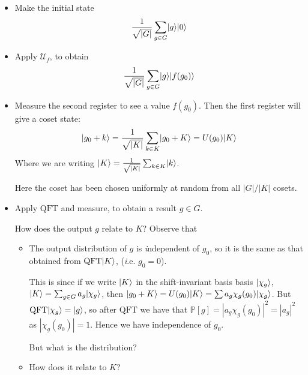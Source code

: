 \documentclass[]{article}
\DeclarePairedDelimiter\ket{\lvert}{\rangle}
\theoremstyle{custhm}
\theoremstyle{cusdef}
\theoremstyle{custhm}
\theoremstyle{custhm}
\theoremstyle{custhm}
\theoremstyle{custhm}
\theoremstyle{cusdef}
\theoremstyle{remark}
\renewcommand{\P}{\mathbb{P}}
\renewcommand{\it}[1]{\textit{#1}}
\newcommand{\qft}{\textrm{QFT}}
\begin{document}
\begin{itemize}
	\item Make the initial state
	\begin{align*}
		\frac{1}{\sqrt{|G|}}\sum_{g\in G} \ket{g}\ket{0}
	\end{align*}
	\item Apply $\mathcal{U}_f$, to obtain
	\begin{align*}
		\frac{1}{\sqrt{|G|}}\sum_{g\in G}\ket{g}\ket{f(g_0)}
	\end{align*}
	\item Measure the second register to see a value $f(g_0)$. Then the first register will give a coset state:
	\begin{align*}
		\ket{g_0 + k} = \frac{1}{\sqrt{|K|}} \sum_{k\in K}\ket{g_0 + K} = U(g_0)\ket{K}
	\end{align*}
	Where we are writing $\ket{K} = \frac{1}{\sqrt{|K|}}\sum_{k\in K}\ket{k}$.
	
	Here the coset has been chosen uniformly at random from all $|G|/|K|$ cosets.
	
	\item Apply $\qft$ and measure, to obtain a result $g\in G$.
	
	How does the output $g$ relate to $K$? Observe that
	\begin{itemize}
		\item The output distribution of $g$ is {\it independent} of $g_0$, so it is the same as that obtained from $\qft\ket{K}$, ({\it i.e.} $g_0 = 0$).
		
		This is since if we write $\ket{K}$ in the shift-invariant basis basis $\ket{\chi_g}$, $\ket{K} = \sum_{g\in G}a_g \ket{\chi_g}$, then $\ket{g_0+K} = U(g_0)\ket{K} = \sum a_g\chi_g(g_0)\ket{\chi_g}$. But $\qft \ket{\chi_g} = \ket{g}$, so after $\qft$ we have that $\P[g] = |a_g\chi_g(g_0)|^2 = |a_g|^2$ as $|\chi_g(g_0)| = 1$. Hence we have independence of $g_0$.
		
		But what is the distribution?
		
		\item How does it relate to $K$?
	\end{itemize}
\end{itemize}
\end{document}
